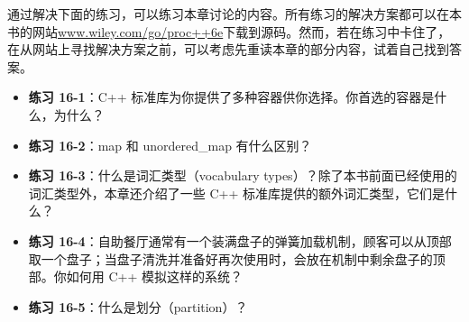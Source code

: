 通过解决下面的练习，可以练习本章讨论的内容。所有练习的解决方案都可以在本书的网站\url{www.wiley.com/go/proc++6e}下载到源码。然而，若在练习中卡住了，在从网站上寻找解决方案之前，可以考虑先重读本章的部分内容，试着自己找到答案。


\begin{itemize}
\item
\textbf{练习 16-1}：C++ 标准库为你提供了多种容器供你选择。你首选的容器是什么，为什么？

\item
\textbf{练习 16-2}：map 和 unordered\_map 有什么区别？

\item
\textbf{练习 16-3}：什么是词汇类型（vocabulary types）？除了本书前面已经使用的词汇类型外，本章还介绍了一些 C++ 标准库提供的额外词汇类型，它们是什么？

\item
\textbf{练习 16-4}：自助餐厅通常有一个装满盘子的弹簧加载机制，顾客可以从顶部取一个盘子；当盘子清洗并准备好再次使用时，会放在机制中剩余盘子的顶部。你如何用 C++ 模拟这样的系统？

\item
\textbf{练习 16-5}：什么是划分（partition）？
\end{itemize}